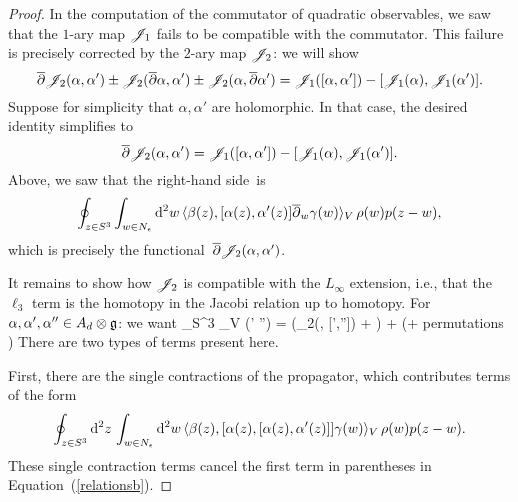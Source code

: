 \begin{proof}
In the computation of the commutator of quadratic observables,
we saw that the $1$-ary map $\mathscr J_1$ fails to be compatible with the commutator.
This failure is precisely corrected by the $2$-ary map $\mathscr J_2$: 
we will show
\[
\overline{\partial} \mathscr J_2(\alpha, \alpha') \pm \mathscr J_2(\overline{\partial} \alpha, \alpha') \pm \mathscr J_2(\alpha, \overline{\partial} \alpha') = \mathscr J_1([\alpha,\alpha']) - [\mathscr J_1(\alpha), \mathscr J_1(\alpha')] .
\] 
Suppose for simplicity that $\alpha,\alpha'$ are holomorphic.
In that case, the desired identity simplifies to 
\[
\overline{\partial} \mathscr J_2(\alpha, \alpha') = \mathscr J_1([\alpha,\alpha']) - [\mathscr J_1(\alpha), \mathscr J_1(\alpha')].
\]
Above, we saw that the right-hand side~is
\[
\oint_{z \in S^3} \int_{w \in N_{\epsilon}} {\rm d}^2 w\,  \langle\beta(z), [\alpha(z),\alpha'(z)] \overline{\partial}_w \gamma(w) \rangle_V \, \rho(w) p(z-w),
\]
which is precisely the functional~$\overline{\partial} \mathscr J_2(\alpha,\alpha')$. 

It remains to show how $\mathscr J_2$ is compatible with the $L_\infty$ extension,
i.e., that the $\ell_3$ term is the homotopy in the Jacobi relation up to homotopy.
For $\alpha,\alpha',\alpha'' \in A_d \otimes \mathfrak g$: we want
\beqn\label{relationsb}
\oint_{S^3} \Tr_V \left(\alpha\wedge \partial \alpha' \wedge \partial \alpha''\right) = \displaystyle \left(\sJ_2(\alpha, [\alpha',\alpha'']) +  \right) + \left( + \; {\rm permutations} \right)
\eeqn
There are two types of terms present here. 

First, there are the single contractions of the propagator, which contributes terms of the form
\[
\oint_{z \in S^3} {\rm d}^2 z\, \int_{w \in N_{\epsilon}} {\rm d}^2 w\,  \langle\beta(z), [\alpha(z), [\alpha(z),\alpha'(z)] ] \gamma(w) \rangle_V \, \rho(w) p(z-w).
\]
These single contraction terms cancel the first term in parentheses in Equation~(\ref{relationsb}). 


\end{proof}
